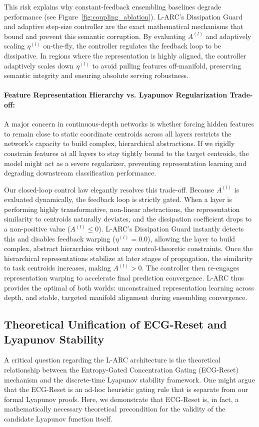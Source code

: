 This risk explains why constant-feedback ensembling baselines degrade performance (see Figure~\ref{fig:coupling_ablation}). L-ARC's Dissipation Guard and adaptive step-size controller are the exact mathematical mechanisms that bound and prevent this semantic corruption. By evaluating $A^{(l)}$ and adaptively scaling $\eta^{(l)}$ on-the-fly, the controller regulates the feedback loop to be dissipative. In regions where the representation is highly aligned, the controller adaptively scales down $\eta^{(l)}$ to avoid pulling features off-manifold, preserving semantic integrity and ensuring absolute serving robustness.

\paragraph{Feature Representation Hierarchy vs. Lyapunov Regularization Trade-off:} A major concern in continuous-depth networks is whether forcing hidden features to remain close to static coordinate centroids across all layers restricts the network's capacity to build complex, hierarchical abstractions. If we rigidly constrain features at all layers to stay tightly bound to the target centroids, the model might act as a severe regularizer, preventing representation learning and degrading downstream classification performance. 

Our closed-loop control law elegantly resolves this trade-off. Because $A^{(l)}$ is evaluated dynamically, the feedback loop is strictly gated. When a layer is performing highly transformative, non-linear abstractions, the representation similarity to centroids naturally deviates, and the dissipation coefficient drops to a non-positive value ($A^{(l)} \le 0$). L-ARC's Dissipation Guard instantly detects this and disables feedback warping ($\eta^{(l)} = 0.0$), allowing the layer to build complex, abstract hierarchies without any control-theoretic constraints. Once the hierarchical representations stabilize at later stages of propagation, the similarity to task centroids increases, making $A^{(l)} > 0$. The controller then re-engages representation warping to accelerate final prediction convergence. L-ARC thus provides the optimal of both worlds: unconstrained representation learning across depth, and stable, targeted manifold alignment during ensembling convergence.

\subsection{Theoretical Unification of ECG-Reset and Lyapunov Stability}
A critical question regarding the L-ARC architecture is the theoretical relationship between the Entropy-Gated Concentration Gating (ECG-Reset) mechanism and the discrete-time Lyapunov stability framework. One might argue that the ECG-Reset is an ad-hoc heuristic gating rule that is separate from our formal Lyapunov proofs. Here, we demonstrate that ECG-Reset is, in fact, a mathematically necessary theoretical precondition for the validity of the candidate Lyapunov function itself.

